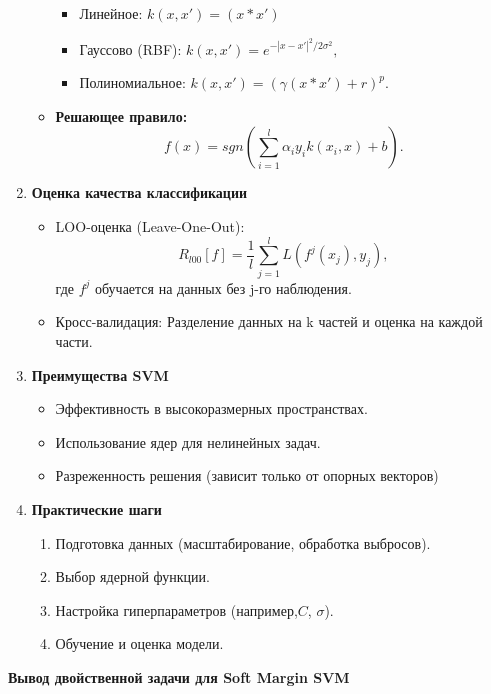 \begin{enumerate}
\begin{itemize}
\begin{itemize}
            \item Линейное: $k(x,x')=(x*x')$
            \item Гауссово (RBF): $k(x,x') = e^{-|x-x'|^2/2\sigma^2},$
            \item Полиномиальное: $k(x,x')=(\gamma(x*x')+r)^p.$
        \end{itemize}
        \item \textbf{Решающее правило:} $$f(x)=sgn(\sum_{i=1}^l\alpha_iy_ik(x_i,x)+b).$$
    \end{itemize}
    \item  \textbf{Оценка качества классификации}
    \begin{itemize}
        \item LOO-оценка (Leave-One-Out): $$R_{l00}[f]=\frac{1}{l}\sum_{j=1}^lL(f^j(x_j),y_j),$$
         где $f^j$ обучается на данных без j-го наблюдения.
         \item Кросс-валидация: Разделение данных на k частей и оценка на каждой части.
    \end{itemize}
    \item  \textbf{Преимущества SVM}
    \begin{itemize}
        \item Эффективность в высокоразмерных пространствах.
        \item Использование ядер для нелинейных задач.
        \item Разреженность решения (зависит только от опорных векторов)
    \end{itemize}
    \item  \textbf{Практические шаги}
    \begin{enumerate}
        \item Подготовка данных (масштабирование, обработка выбросов).
        \item Выбор ядерной функции.
        \item Настройка гиперпараметров (например,$C$, $\sigma$).
        \item Обучение и оценка модели.
    \end{enumerate}
\end{enumerate}
\textbf{Вывод двойственной задачи для Soft Margin SVM}
